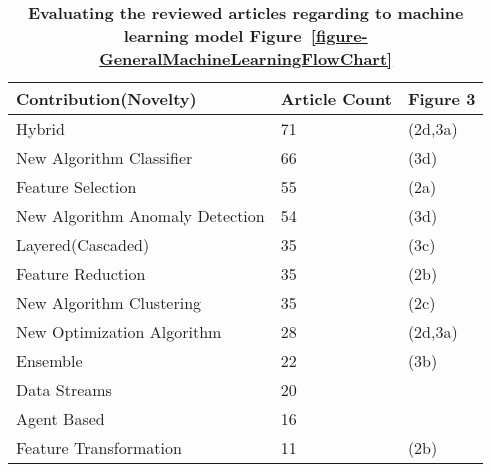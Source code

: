 
\begin{table}[!ht]
\centering 


\scriptsize
\caption{ \textbf{Evaluating the reviewed articles regarding to machine learning model Figure~\ref{figure-GeneralMachineLearningFlowChart}} }
\label{table-metaMainNovelty}

\begin{tabular}{@{}p{}p{}p{}@{}} 


\toprule

\textbf{Contribution(Novelty)}           & \textbf{Article Count} & \textbf{Figure 3} \\

\midrule
Hybrid & 71 &  (2d,3a)  \\ 
New Algorithm Classifier & 66 &  (3d)  \\ 
Feature Selection & 55 &  (2a)  \\ 
New Algorithm Anomaly Detection & 54 &  (3d)  \\ 
Layered(Cascaded) & 35 &  (3c)  \\ 
Feature Reduction & 35 &  (2b)  \\ 
New Algorithm Clustering & 35 &  (2c)  \\ 
New Optimization Algorithm & 28 &  (2d,3a)  \\ 
Ensemble & 22 &  (3b)  \\ 
Data Streams & 20 &  \\ 
Agent Based & 16 &  \\ 
Feature Transformation & 11 &  (2b)  \\ 

\bottomrule

\end{tabular}

\end{table}

